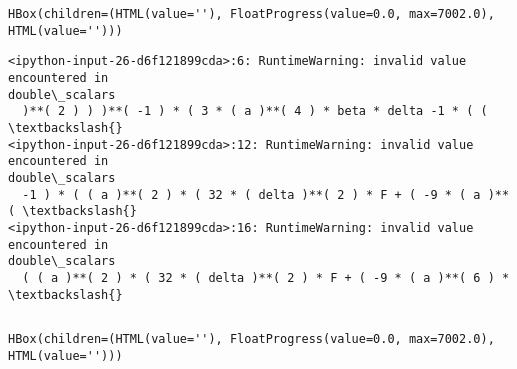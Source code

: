 \documentclass[11pt]{article}
\begin{document}
    
    \begin{Verbatim}[commandchars=\\\{\}]
HBox(children=(HTML(value=''), FloatProgress(value=0.0, max=7002.0), HTML(value='')))
    \end{Verbatim}

    
    \begin{Verbatim}[commandchars=\\\{\}]
<ipython-input-26-d6f121899cda>:6: RuntimeWarning: invalid value encountered in
double\_scalars
  )**( 2 ) ) )**( -1 ) * ( 3 * ( a )**( 4 ) * beta * delta -1 * ( ( \textbackslash{}
<ipython-input-26-d6f121899cda>:12: RuntimeWarning: invalid value encountered in
double\_scalars
  -1 ) * ( ( a )**( 2 ) * ( 32 * ( delta )**( 2 ) * F + ( -9 * ( a )**( \textbackslash{}
<ipython-input-26-d6f121899cda>:16: RuntimeWarning: invalid value encountered in
double\_scalars
  ( ( a )**( 2 ) * ( 32 * ( delta )**( 2 ) * F + ( -9 * ( a )**( 6 ) * \textbackslash{}
    \end{Verbatim}

    \begin{Verbatim}[commandchars=\\\{\}]

    \end{Verbatim}

    
    \begin{Verbatim}[commandchars=\\\{\}]
HBox(children=(HTML(value=''), FloatProgress(value=0.0, max=7002.0), HTML(value='')))
    \end{Verbatim}

    
    \begin{Verbatim}[commandchars=\\\{\}]

    \end{Verbatim}
\end{document}
